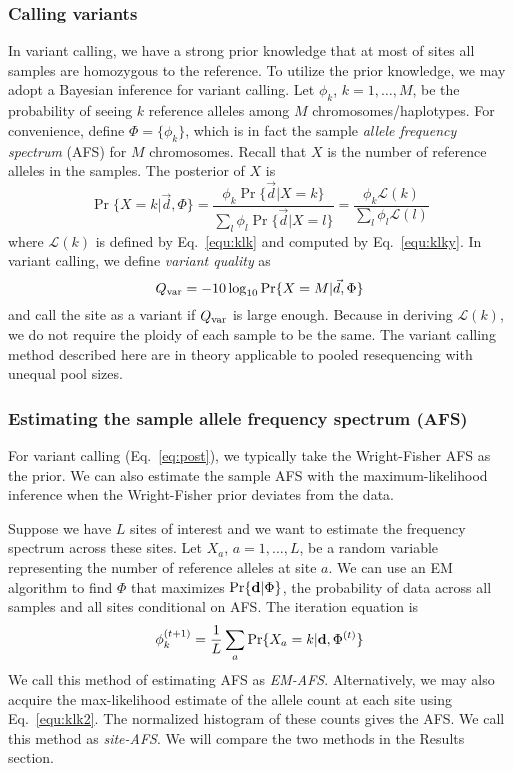 \documentclass{bioinfo}
\begin{document}
\begin{methods}
\subsubsection{Calling variants}
In variant calling, we have a strong prior knowledge that at most of sites all
samples are homozygous to the reference.  To utilize the prior knowledge, we
may adopt a Bayesian inference for variant calling.  Let $\phi_k$, $k=1,\ldots,M$,
be the probability of seeing $k$ reference alleles among $M$
chromosomes/haplotypes. For convenience, define $\Phi=\{\phi_k\}$, which is in
fact the sample \emph{allele frequency spectrum} (AFS) for $M$ chromosomes.
Recall that $X$ is the number of reference alleles in the samples. The posterior of
$X$ is
\begin{equation}\label{eq:post}
\Pr\{X=k|\vec{d},\Phi\}=\frac{\phi_k\Pr\{\vec{d}|X=k\}}{\sum_l\phi_l\Pr\{\vec{d}|X=l\}}
=\frac{\phi_k\mathcal{L}(k)}{\sum_l\phi_l\mathcal{L}(l)}
\end{equation}
where $\mathcal{L}(k)$ is defined by Eq.~\eqref{equ:klk} and computed by
Eq.~\eqref{equ:klky}.  In variant calling, we define \emph{variant quality} as
$$
Q_{\rm var}=-10\log_{10}\Pr\{X=M|\vec{d},\Phi\}
$$
and call the site as a variant if $Q_{\rm var}$ is large enough. Because in
deriving $\mathcal{L}(k)$, we do not require the ploidy of each sample to be
the same. The variant calling method described here are in theory applicable to
pooled resequencing with unequal pool sizes.

\subsubsection{Estimating the sample allele frequency spectrum (AFS)}
For variant calling (Eq.~\ref{eq:post}), we typically take the Wright-Fisher AFS as the prior. We
can also estimate the sample AFS with the maximum-likelihood inference when the
Wright-Fisher prior deviates from the data.

Suppose we have $L$ sites of interest and we want to estimate the frequency
spectrum across these sites.  Let $X_a$, $a=1,\ldots,L$, be a random variable
representing the number of reference alleles at site $a$. We can use an EM
algorithm to find $\Phi$ that maximizes
$\Pr\{{\bf d}|\Phi\}$, the probability of data across all samples and all sites conditional on AFS.
The iteration equation is
\begin{equation}\label{eq:afs}
\phi_k^{(t+1)}=\frac{1}{L}\sum_a\Pr\{X_a=k|{\bf d},\Phi^{(t)}\}
\end{equation}
We call this method of estimating AFS as \emph{EM-AFS}. Alternatively, we may
also acquire the max-likelihood estimate of the allele count at each site using
Eq.~\eqref{equ:klk2}. The normalized histogram of these counts gives the AFS.
We call this method as \emph{site-AFS}. We will compare the two methods in the
Results section.


\end{methods}
\end{document}
